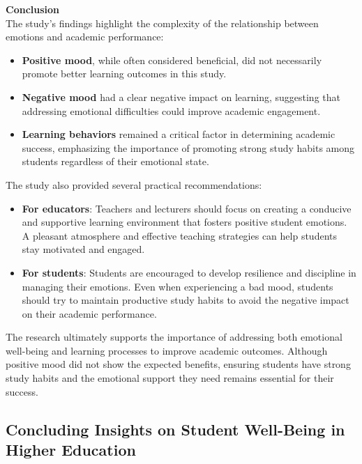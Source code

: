 \noindent \textbf{Conclusion} \\
The study's findings highlight the complexity of the relationship between emotions and academic performance:

\begin{itemize}
    \item \textbf{Positive mood}, while often considered beneficial, did not necessarily promote better learning outcomes in this study.
    \item \textbf{Negative mood} had a clear negative impact on learning, suggesting that addressing emotional difficulties could improve academic engagement.
    \item \textbf{Learning behaviors} remained a critical factor in determining academic success, emphasizing the importance of promoting strong study habits among students regardless of their emotional state.
\end{itemize} 

\noindent The study also provided several practical recommendations:

\begin{itemize}
    \item \textbf{For educators}: Teachers and lecturers should focus on creating a conducive and supportive learning environment that fosters positive student emotions. A pleasant atmosphere and effective teaching strategies can help students stay motivated and engaged.
    \item \textbf{For students}: Students are encouraged to develop resilience and discipline in managing their emotions. Even when experiencing a bad mood, students should try to maintain productive study habits to avoid the negative impact on their academic performance.
\end{itemize} 

\noindent The research ultimately supports the importance of addressing both emotional well-being and learning processes to improve academic outcomes. Although positive mood did not show the expected benefits, ensuring students have strong study habits and the emotional support they need remains essential for their success.

\subsection{Concluding Insights on Student Well-Being in Higher Education}

